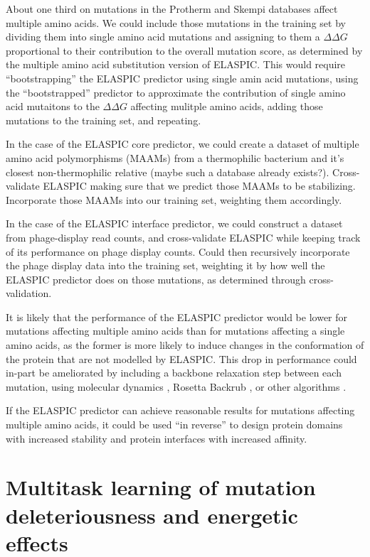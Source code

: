 About one third on mutations in the Protherm and Skempi databases affect multiple amino acids. We could include those mutations in the training set by dividing them into single amino acid mutations and assigning to them a $\Delta \Delta G$ proportional to their contribution to the overall mutation score, as determined by the multiple amino acid substitution version of ELASPIC. This would require ``bootstrapping'' the ELASPIC predictor using single amin acid mutations, using the ``bootstrapped'' predictor to approximate the contribution of single amino acid mutaitons to the $\Delta \Delta G$ affecting mulitple amino acids, adding those mutations to the training set, and repeating.

In the case of the ELASPIC core predictor, we could create a dataset of multiple amino acid polymorphisms (MAAMs) from a thermophilic bacterium and it's closest non-thermophilic relative (maybe such a database already exists?). Cross-validate ELASPIC making sure that we predict those MAAMs to be stabilizing. Incorporate those MAAMs into our training set, weighting them accordingly.

In the case of the ELASPIC interface predictor, we could construct a dataset from phage-display read counts, and cross-validate ELASPIC while keeping track of its performance on phage display counts. Could then recursively incorporate the phage display data into the training set, weighting it by how well the ELASPIC predictor does on those mutations, as determined through cross-validation.

It is likely that the performance of the ELASPIC predictor would be lower for mutations affecting multiple amino acids than for mutations affecting a single amino acids, as the former is more likely to induce changes in the conformation of the protein that are not modelled by ELASPIC. This drop in performance could in-part be ameliorated by including a backbone relaxation step between each mutation, using molecular dynamics \cite{abraham_gromacs:_2015}, Rosetta Backrub \cite{smith_predicting_2011}, or other algorithms \cite{sun_protein_2016}.

If the ELASPIC predictor can achieve reasonable results for mutations affecting multiple amino acids, it could be used ``in reverse'' to design protein domains with increased stability and protein interfaces with increased affinity.



\section{Multitask learning of mutation deleteriousness and energetic effects} \label{sec:better_features}


